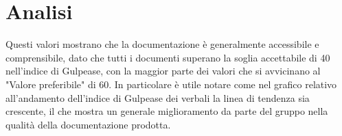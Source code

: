 \section*{Analisi}

Questi valori mostrano che la documentazione è generalmente accessibile e comprensibile, 
dato che tutti i documenti superano la soglia accettabile di 40 nell'indice di Gulpease, 
con la maggior parte dei valori che si avvicinano al "Valore preferibile" di 60. 
In particolare è utile notare come nel grafico relativo all'andamento dell'indice di Gulpease dei verbali la linea di tendenza sia crescente,
il che mostra un generale miglioramento da parte del gruppo nella qualità della documentazione prodotta.
